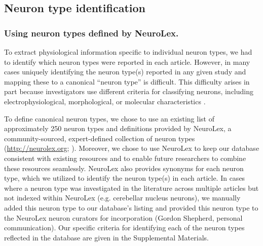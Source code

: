\documentclass{template/frontiersSCNS} %
\begin{document}
\subsection{Neuron type identification}

\subsubsection{Using neuron types defined by NeuroLex.}
To extract physiological information specific to individual neuron types, we had to identify which neuron types were reported in each article.  
However, in many cases uniquely identifying the neuron type(s) reported in any given study and mapping these to a canonical ``neuron type'' is difficult.  
This difficulty arises in part because investigators use different criteria for classifying neurons, including electrophysiological, morphological, or molecular characteristics \citep{ascoli_petilla_2008,huang_genetic_2013,fishell_neuron_2013}.  

To define canonical neuron types, we chose to use an existing list of approximately 250 neuron types and definitions provided by NeuroLex, a community-sourced, expert-defined collection of neuron types (\url{http://neurolex.org}; \citet{shepherd_synaptic_2003,hamilton_ontological_2012,larson_neurolex.org:_2013}).  
Moreover, we chose to use NeuroLex to keep our database consistent with existing resources and to enable future researchers to combine these resources seamlessly.  
NeuroLex also provides synonyms for each neuron type, which we utilized to identify the neuron type(s) in each article.  
In cases where a neuron type was investigated in the literature across multiple articles but not indexed within NeuroLex (e.g. cerebellar nucleus neurons), we manually added this neuron type to our database's listing and provided this neuron type to the NeuroLex neuron curators for incorporation (Gordon Shepherd, personal communication).  
Our specific criteria for identifying each of the neuron types reflected in the database are given in the Supplemental Materials.
\end{document}

